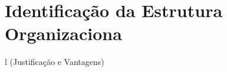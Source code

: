 \section{Identificação da Estrutura Organizaciona} \label{section: Identificação da Estrutura Organizaciona}
l (Justificação e Vantagens)
